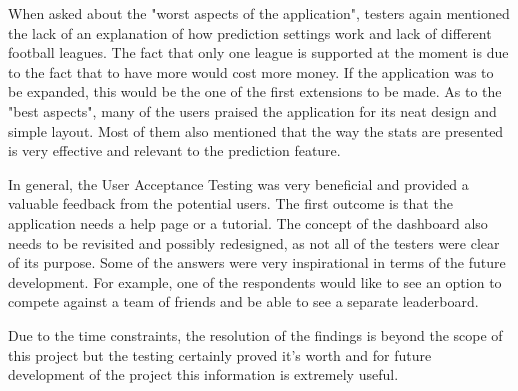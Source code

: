 When asked about the "worst aspects of the application", testers again mentioned the lack of an explanation of how prediction settings work and lack of different football leagues. The fact that only one league is supported at the moment is due to the fact that to have more would cost more money. If the application was to be expanded, this would be the one of the first extensions to be made. As to the "best aspects", many of the users praised the application for its neat design and simple layout. Most of them also mentioned that the way the stats are presented is very effective and relevant to the prediction feature.

In general, the User Acceptance Testing was very beneficial and provided a valuable feedback from the potential users. The first outcome is that the application needs a help page or a tutorial. The concept of the dashboard also needs to be revisited and possibly redesigned, as not all of the testers were clear of its purpose. Some of the answers were very inspirational in terms of the future development. For example, one of the respondents would like to see an option to compete against a team of friends and be able to see a separate leaderboard.

Due to the time constraints, the resolution of the findings is beyond the scope of this project but the testing certainly proved it's worth and for future development of the project this information is extremely useful.
